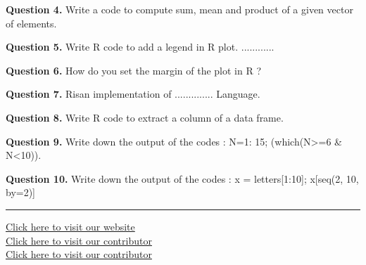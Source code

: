 \documentclass[11pt,a4paper]{article}
\begin{document}
\medskip\noindent\textbf{Question 4.} Write a code to compute sum, mean and product of a
given vector of elements.

\medskip\noindent\textbf{Question 5.} Write R code to add a legend in R plot. ............

\medskip\noindent\textbf{Question 6.} How do you set the margin of the plot in R ?

\medskip\noindent\textbf{Question 7.} Risan implementation of .............. Language.

\medskip\noindent\textbf{Question 8.} Write R code to extract a column of a data frame.

\medskip\noindent\textbf{Question 9.} Write down the output of the codes :
N=1: 15; (which(N>=6 \& N<10)).

\medskip\noindent\textbf{Question 10.} Write down the output of the codes :
x = letters[1:10]; x[seq(2, 10, by=2)]

\vfill
\rule{\linewidth}{0.4pt}
\begin{center}\small
\href{https://bhu-exam.vercel.app/}{Click here to visit our website}\\[4pt]\href{https://me-aryan.vercel.app/}{Click here to visit our contributor}\\[4pt]\href{https://quashan-me.vercel.app/}{Click here to visit our contributor}
\end{center}
\end{document}
